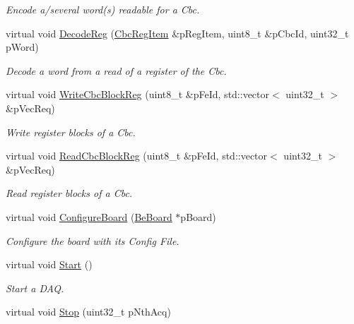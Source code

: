 \begin{DoxyCompactItemize}
\begin{DoxyCompactList}\small\item\em Encode a/several word(s) readable for a Cbc. \end{DoxyCompactList}\item 
virtual void \hyperlink{class_ph2___hw_interface_1_1_be_board_f_w_interface_a31041cc7eee33af5663c035b88f5749c}{Decode\-Reg} (\hyperlink{struct_ph2___hw_description_1_1_cbc_reg_item}{Cbc\-Reg\-Item} \&p\-Reg\-Item, uint8\-\_\-t \&p\-Cbc\-Id, uint32\-\_\-t p\-Word)
\begin{DoxyCompactList}\small\item\em Decode a word from a read of a register of the Cbc. \end{DoxyCompactList}\item 
virtual void \hyperlink{class_ph2___hw_interface_1_1_be_board_f_w_interface_abfda233c55aaa85fcd3773fa424764d5}{Write\-Cbc\-Block\-Reg} (uint8\-\_\-t \&p\-Fe\-Id, std\-::vector$<$ uint32\-\_\-t $>$ \&p\-Vec\-Req)
\begin{DoxyCompactList}\small\item\em Write register blocks of a Cbc. \end{DoxyCompactList}\item 
virtual void \hyperlink{class_ph2___hw_interface_1_1_be_board_f_w_interface_aef5cfbb0b5adceff7ccc6babd3d01642}{Read\-Cbc\-Block\-Reg} (uint8\-\_\-t \&p\-Fe\-Id, std\-::vector$<$ uint32\-\_\-t $>$ \&p\-Vec\-Req)
\begin{DoxyCompactList}\small\item\em Read register blocks of a Cbc. \end{DoxyCompactList}\item 
virtual void \hyperlink{class_ph2___hw_interface_1_1_be_board_f_w_interface_a2507c664f19d1d5e3f6de69da16365e8}{Configure\-Board} (\hyperlink{class_ph2___hw_description_1_1_be_board}{Be\-Board} $\ast$p\-Board)
\begin{DoxyCompactList}\small\item\em Configure the board with its Config File. \end{DoxyCompactList}\item 
virtual void \hyperlink{class_ph2___hw_interface_1_1_be_board_f_w_interface_a2835dae7ec6788c1d5728e53f9c3051a}{Start} ()
\begin{DoxyCompactList}\small\item\em Start a D\-A\-Q. \end{DoxyCompactList}\item 
virtual void \hyperlink{class_ph2___hw_interface_1_1_be_board_f_w_interface_af7825e291796f7c8c498a92365583e08}{Stop} (uint32\-\_\-t p\-Nth\-Acq)

\end{DoxyCompactItemize}
